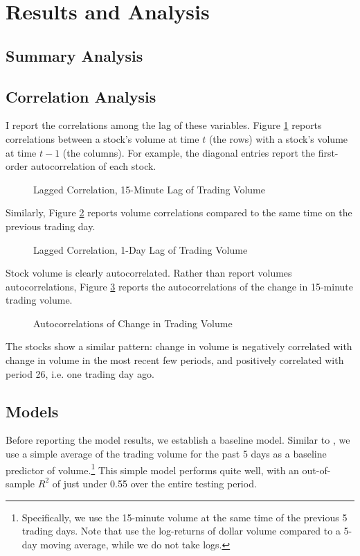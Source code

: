 \documentclass[12pt]{article}
\begin{document}
\section{Results and Analysis}
\subsection{Summary Analysis}
\subsection{Correlation Analysis}
I report the correlations among the lag of these variables. Figure \ref{fig:lagged_volume} reports correlations between a stock's volume at time $t$ (the rows) with a stock's volume at time $t-1$ (the columns). For example, the diagonal entries report the first-order autocorrelation of each stock.

\begin{figure}[H]
    \centering
    \caption{Lagged Correlation, 15-Minute Lag of Trading Volume}
    \label{fig:lagged_volume}
\end{figure}

Similarly, Figure \ref{fig:lagged_volume_day} reports volume correlations compared to the same time on the previous trading day.

\begin{figure}[H]
    \centering
    \caption{Lagged Correlation, 1-Day Lag of Trading Volume}
    \label{fig:lagged_volume_day}
\end{figure}

Stock volume is clearly autocorrelated. Rather than report volumes autocorrelations, Figure \ref{fig:autocorrelations} reports the autocorrelations of the change in 15-minute trading volume. 

\begin{figure}[H]
    \centering
    \caption{Autocorrelations of Change in Trading Volume}
    \label{fig:autocorrelations}
\end{figure}

The stocks show a similar pattern: change in volume is negatively correlated with change in volume in the most recent few periods, and positively correlated with period 26, i.e. one trading day ago.

\subsection{Models}
Before reporting the model results, we establish a baseline model. Similar to \textcite{goyenko2024trading}, we use a simple average of the trading volume for the past 5 days as a baseline predictor of volume.\footnote{Specifically, we use the 15-minute volume at the same time of the previous 5 trading days. Note that \textcite{goyenko2024trading} use the log-returns of dollar volume compared to a 5-day moving average, while we do not take logs.} This simple model performs quite well, with an out-of-sample $R^2$ of just under 0.55 over the entire testing period.
\end{document}
